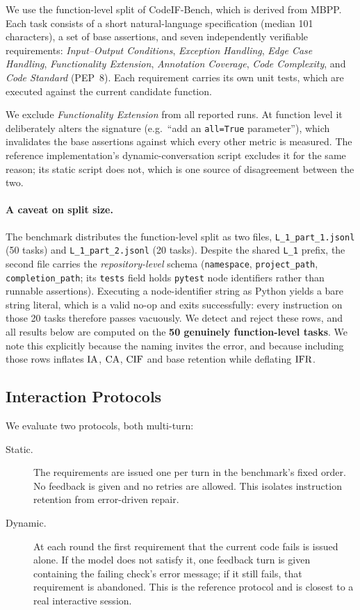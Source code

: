 We use the function-level split of CodeIF-Bench, which is derived from MBPP.
Each task consists of a short natural-language specification (median 101
characters), a set of base assertions, and seven independently verifiable
requirements: \emph{Input--Output Conditions}, \emph{Exception Handling},
\emph{Edge Case Handling}, \emph{Functionality Extension}, \emph{Annotation
Coverage}, \emph{Code Complexity}, and \emph{Code Standard} (PEP~8). Each
requirement carries its own unit tests, which are executed against the current
candidate function.

We exclude \emph{Functionality Extension} from all reported runs. At function
level it deliberately alters the signature (e.g.\ ``add an \texttt{all=True}
parameter''), which invalidates the base assertions against which every other
metric is measured. The reference implementation's dynamic-conversation script
excludes it for the same reason; its static script does not, which is one
source of disagreement between the two.

\paragraph{A caveat on split size.}
The benchmark distributes the function-level split as two files,
\texttt{L\_1\_part\_1.jsonl} (50 tasks) and \texttt{L\_1\_part\_2.jsonl} (20
tasks). Despite the shared \texttt{L\_1} prefix, the second file carries the
\emph{repository-level} schema (\texttt{namespace}, \texttt{project\_path},
\texttt{completion\_path}; its \texttt{tests} field holds \texttt{pytest} node
identifiers rather than runnable assertions). Executing a node-identifier
string as Python yields a bare string literal, which is a valid no-op and exits
successfully: every instruction on those 20 tasks therefore passes vacuously.
We detect and reject these rows, and all results below are computed on the
\textbf{50 genuinely function-level tasks}. We note this explicitly because the
naming invites the error, and because including those rows inflates $\mathrm{IA}$,
$\mathrm{CA}$, $\mathrm{CIF}$ and base retention while deflating $\mathrm{IFR}$.

\subsection{Interaction Protocols}

We evaluate two protocols, both multi-turn:

\begin{description}
  \item[Static.] The requirements are issued one per turn in the benchmark's
    fixed order. No feedback is given and no retries are allowed. This isolates
    instruction retention from error-driven repair.
  \item[Dynamic.] At each round the first requirement that the current code
    fails is issued alone. If the model does not satisfy it, one feedback turn
    is given containing the failing check's error message; if it still fails,
    that requirement is abandoned. This is the reference protocol and is closest
    to a real interactive session.
\end{description}

